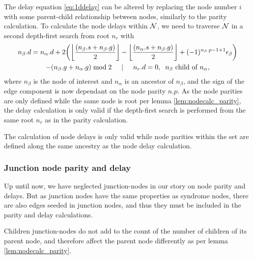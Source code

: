 The delay equation \ref{eq:1ddelay} can be altered by replacing the node number $i$ with some parent-child relationship between nodes, similarly to the parity calculation. To calculate the node delays within $\mathcal{N}$, we need to traverse $\mathcal{N}$ in a second depth-first search from root $n_r$ with
\begin{multline}\label{eq:2ddelay}
  n_\beta.d = n_\alpha.d + 2\bigg({\left \lfloor \frac{(n_\beta.s+n_\beta.g)}{2} \right \rfloor } - {\left \lfloor \frac{(n_\alpha.s+n_\beta.g)}{2} \right \rfloor } + (-1)^{n_\beta.p-1+1}\epsilon_\beta\bigg) \\
         - (n_\beta.g + n_\alpha.g)\bmod 2 \hspace{.5cm} | \hspace{.5cm} n_r.d = 0, \hspace{.2cm} n_\beta \mbox{ child of } n_\alpha,
\end{multline}
where $n_\beta$ is the node of interest and $n_\alpha$ is an ancestor of $n_\beta$, and the sign of the edge component is now dependant on the node parity $n.p$. As the node parities are only defined while the same node is root per lemma \ref{lem:nodecalc_parity}, the delay calculation is only valid if the depth-first search is performed from the same root $n_r$ as in the parity calculation. 

\begin{lemma}\label{lem:nodecalc_ancestrypath}
 The calculation of node delays is only valid while node parities within the set are defined along the same ancestry as the node delay calculation.
\end{lemma}

\subsubsection{Junction node parity and delay}

Up until now, we have neglected junction-nodes in our story on node parity and delays. But as junction nodes have the same properties as syndrome nodes, there are also edges seeded in junction nodes, and thus they must be included in the parity and delay calculations. 

\begin{lemma}\label{lem:nodecalc_junction}
  Children junction-nodes do not add to the count of the number of children of its parent node, and therefore affect the parent node differently as per lemma \ref{lem:nodecalc_parity}.
\end{lemma}



